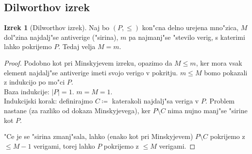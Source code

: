 \documentclass[a4paper,12pt]{article}
\theoremstyle{definition}
\newtheorem{theorem}[counter]{Izrek}
\theoremstyle{remark}
\begin{document}
\subsection{Dilworthov izrek}
\begin{theorem}[Dilworthov izrek]
	Naj bo $(P, \leqslant)$ kon"cna delno urejena mno"zica, $M$ dol"zina najdalj"se antiverige ("sirina), $m$ pa najmanj"se "stevilo verig, s katerimi lahko pokrijemo $P$. Tedaj velja $M = m$.
\end{theorem}
\begin{proof}
	Podobno kot pri Minskyjevem izreku, opazimo da $M \leqslant m$, ker mora vsak element najdalj"se antiverige imeti svojo verigo v pokritju. $m \leqslant M$ bomo pokazali z indukcijo po mo"ci $P$.\\
	Baza indukcije: $|P| = 1$. $m = M = 1$.\\
	Indukcijski korak: definirajmo $C \coloneqq$ katerakoli najdalj"sa veriga v $P$. Problem nastane (za razliko od dokaza Minskyjevega), ker $P \setminus C$ nima nujno manj"se "sirine kot $P$.
	
	"Ce je se "sirina zmanj"sala, lahko (enako kot pri Minskyjevem) $P\setminus C$ pokrijemo z $\leqslant M-1$ verigami, torej lahko $P$ pokrijemo z $\leqslant M$ verigami.
	

\end{proof}
\end{document}
